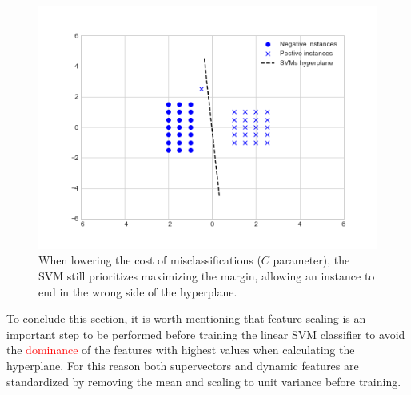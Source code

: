 \begin{figure}[H]
  \centering
  \includegraphics[width=.55\linewidth]{files/figures/method/soft_margin_low_c}
  \caption{When lowering the cost of misclassifications ($C$ parameter), the SVM still
  prioritizes maximizing the margin, allowing an instance to end in the wrong side
  of the hyperplane.}
  \label{fig:soft_margin_low_c}
\end{figure}

To conclude this section, it is worth mentioning that feature scaling is an important
step to be performed before training
the linear SVM classifier to avoid the \textcolor{red}{dominance} of the
features with highest values
when calculating the hyperplane. For this reason both supervectors
and dynamic features are standardized by removing the mean and scaling to unit variance
before training.






